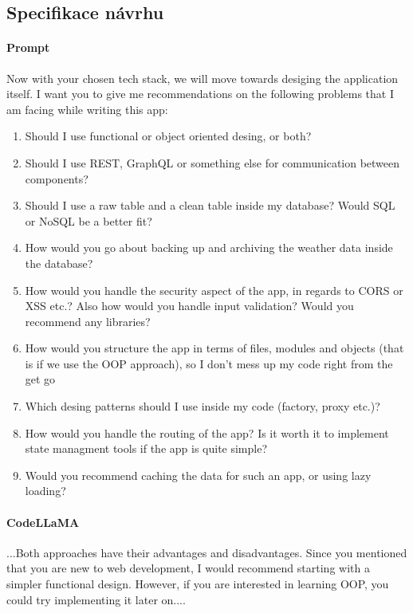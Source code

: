 \documentclass[FM,DP]{tulthesis}
\begin{document}
		\subsection{Specifikace návrhu}
		\vspace{0.6em}
		\begin{tcolorbox}[colback=white,colframe=black]
			\paragraph{Prompt}
			Now with your chosen tech stack, we will move towards desiging the application itself. I want you to give me recommendations on the following problems that I am facing while writing this app:
			\begin{enumerate}
				\item Should I use functional or object oriented desing, or both?
				\item Should I use REST, GraphQL or something else for communication between components?
				\item Should I use a raw table and a clean table inside my database? Would SQL or NoSQL be a better fit?
				\item How would you go about backing up and archiving the weather data inside the database?
				\item How would you handle the security aspect of the app, in regards to CORS or XSS etc.? Also how would you handle input validation? Would you recommend any libraries?
				\item How would you structure the app in terms of files, modules and objects (that is if we use the OOP approach), so I don't mess up my code right from the get go
				\item Which desing patterns should I use inside my code (factory, proxy etc.)?
				\item How would you handle the routing of the app? Is it worth it to implement state managment tools if the app is quite simple?
				\item Would you recommend caching the data for such an app, or using lazy loading?
			\end{enumerate}
			
			\vspace{0.6em}
			\paragraph{CodeLLaMA}
			...Both approaches have their advantages and disadvantages. Since you mentioned that you are new to web development, I would recommend starting with a simpler functional design. However, if you are interested in learning OOP, you could try implementing it later on.... \cite{codellama_navrh}
		\end{tcolorbox}
		\vspace{0.6em}
		
\end{document}
